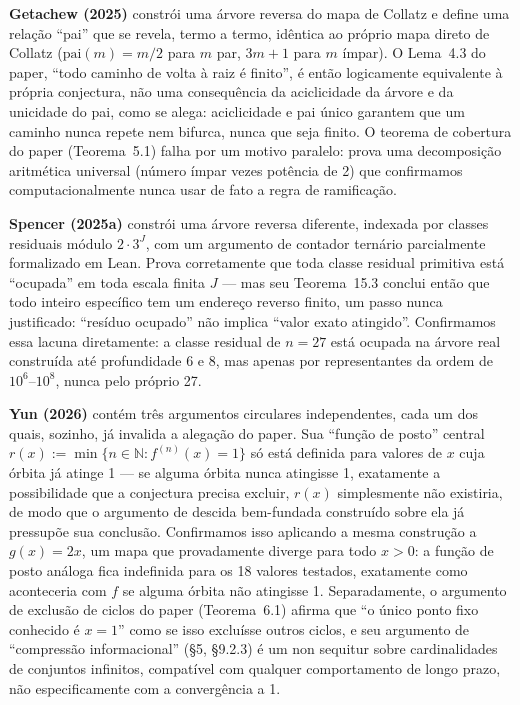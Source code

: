 \documentclass[11pt]{article}
\newcommand{\NN}{\mathbb{N}}
\begin{document}
\textbf{Getachew (2025)} \cite{Getachew2025} constrói uma árvore reversa
do mapa de Collatz e define uma relação ``pai'' que se revela, termo a
termo, idêntica ao próprio mapa direto de Collatz
($\mathrm{pai}(m) = m/2$ para $m$ par, $3m+1$ para $m$ ímpar). O
Lema~4.3 do paper, ``todo caminho de volta à raiz é finito'', é então
logicamente equivalente à própria conjectura, não uma consequência da
aciclicidade da árvore e da unicidade do pai, como se alega:
aciclicidade e pai único garantem que um caminho nunca repete nem
bifurca, nunca que seja finito. O teorema de cobertura do paper
(Teorema~5.1) falha por um motivo paralelo: prova uma decomposição
aritmética universal (número ímpar vezes potência de 2) que
confirmamos computacionalmente nunca usar de fato a regra de
ramificação.

\textbf{Spencer (2025a)} \cite{Spencer2025a} constrói uma árvore reversa
diferente, indexada por classes residuais módulo $2\cdot 3^J$, com um
argumento de contador ternário parcialmente formalizado em Lean. Prova
corretamente que toda classe residual primitiva está ``ocupada'' em
toda escala finita $J$ --- mas seu Teorema~15.3 conclui então que todo
inteiro específico tem um endereço reverso finito, um passo nunca
justificado: ``resíduo ocupado'' não implica ``valor exato atingido''.
Confirmamos essa lacuna diretamente: a classe residual de $n=27$ está
ocupada na árvore real construída até profundidade 6 e 8, mas apenas
por representantes da ordem de $10^6$--$10^8$, nunca pelo próprio 27.

\textbf{Yun (2026)} \cite{Yun2026} contém três argumentos circulares
independentes, cada um dos quais, sozinho, já invalida a alegação do
paper. Sua ``função de posto'' central
$r(x) := \min\{n \in \NN : f^{(n)}(x) = 1\}$ só está definida para
valores de $x$ cuja órbita já atinge 1 --- se alguma órbita nunca
atingisse 1, exatamente a possibilidade que a conjectura precisa
excluir, $r(x)$ simplesmente não existiria, de modo que o argumento de
descida bem-fundada construído sobre ela já pressupõe sua conclusão.
Confirmamos isso aplicando a mesma construção a $g(x)=2x$, um mapa que
provadamente diverge para todo $x>0$: a função de posto análoga fica
indefinida para os 18 valores testados, exatamente como aconteceria com
$f$ se alguma órbita não atingisse 1. Separadamente, o argumento de
exclusão de ciclos do paper (Teorema~6.1) afirma que ``o único ponto
fixo conhecido é $x=1$'' como se isso excluísse outros ciclos, e seu
argumento de ``compressão informacional'' (\S5, \S9.2.3) é um non
sequitur sobre cardinalidades de conjuntos infinitos, compatível com
qualquer comportamento de longo prazo, não especificamente com a
convergência a 1.
\end{document}
